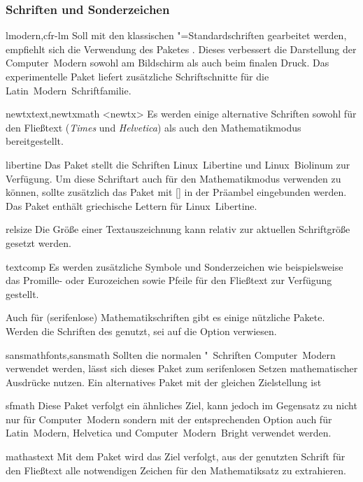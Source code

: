 \subsubsection{Schriften und Sonderzeichen}
%
\begin{packages}
\item[lmodern,cfr-lm]
  Soll mit den klassischen "=Standardschriften gearbeitet werden, 
  empfiehlt sich die Verwendung des Paketes . Dieses 
  verbessert die Darstellung der Computer~Modern sowohl am Bildschirm als auch 
  beim finalen Druck. Das experimentelle Paket  liefert 
  zusätzliche Schriftschnitte für die Latin~Modern~Schriftfamilie.
\item[newtxtext,newtxmath]<newtx>
  Es werden einige alternative Schriften sowohl für den Fließtext 
  (\textit{Times} und \textit{Helvetica}) als auch den Mathematikmodus 
  bereitgestellt.
\item[libertine]
  Das Paket stellt die Schriften Linux~Libertine und Linux~Biolinum zur 
  Verfügung. Um diese Schriftart auch für den Mathematikmodus verwenden zu 
  können, sollte zusätzlich das Paket  mit 
  [] in der 
  Präambel eingebunden werden. Das Paket  enthält griechische 
  Lettern für Linux~Libertine.
\item[relsize]
  Die Größe einer Textauszeichnung kann relativ zur aktuellen Schriftgröße 
  gesetzt werden.
\item[textcomp]
  Es werden zusätzliche Symbole und Sonderzeichen wie beispielsweise das 
  Promille- oder Eurozeichen sowie Pfeile für den Fließtext zur Verfügung 
  gestellt.
\end{packages}
%
%
Auch für (serifenlose) Mathematikschriften gibt es einige nützliche Pakete. 
Werden die Schriften des \CDs genutzt, sei auf die Option  
verwiesen.
%
\begin{packages}
\item[sansmathfonts,sansmath]
  Sollten die normalen "~Schriften Computer~Modern verwendet 
  werden, lässt sich dieses Paket zum serifenlosen Setzen mathematischer 
  Ausdrücke nutzen. Ein alternatives Paket mit der gleichen Zielstellung ist 
\item[sfmath]
  Diese Paket verfolgt ein ähnliches Ziel, kann jedoch im Gegensatz zu 
   nicht nur für Computer~Modern sondern mit der 
  entsprechenden Option auch für Latin~Modern, Helvetica und 
  Computer~Modern~Bright verwendet werden.
\item[mathastext]
  Mit dem Paket wird das Ziel verfolgt, aus der genutzten Schrift für den 
  Fließtext alle notwendigen Zeichen für den Mathematiksatz zu extrahieren.
\end{packages}



